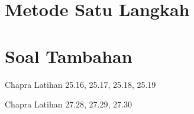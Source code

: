 \section{Metode Satu Langkah}












%

\section{Soal Tambahan}

Chapra Latihan 25.16, 25.17, 25.18, 25.19

Chapra Latihan 27.28, 27.29, 27.30


